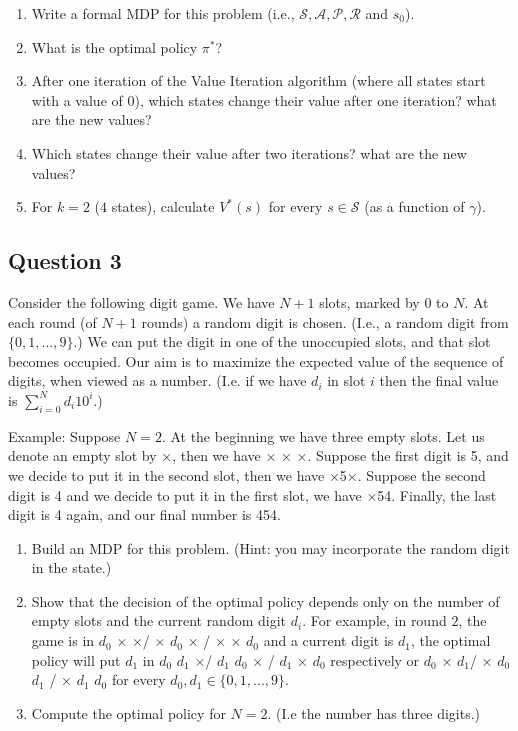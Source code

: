 \documentclass[11pt]{article}
\begin{document}
\begin{enumerate}
\item Write a formal MDP for this problem (i.e., $\mathcal{S}, {\mathcal{A}}, \mathcal{P}, {\mathcal{R}}$ and $s_0 $).
\item What is the optimal policy $\pi^*$?
\item After one iteration of the Value Iteration algorithm (where all states start with a value of $0$), which states change their value after one iteration? what are the new values?
\item Which states change their value after two iterations? what are the new values?
\item For $k=2$ ($4$ states), calculate $V^*(s)$ for every $s\in \mathcal{S}$ (as a function of $\gamma$).

\end{enumerate}

\newpage
\subsection{Question 3}
Consider the following digit game. We have $N+1$ slots, marked by $0$ to $N$. At each round (of $N+1$ rounds) a random digit is chosen. (I.e., a random digit from $\{0,1,...,9\}$.) We can put the digit in one of the unoccupied slots, and that slot becomes occupied. %
Our aim is to maximize the expected value of the sequence of digits, when viewed as a number. (I.e. if we have $d_i$ in slot $i$ then the final value is  $\sum_{i=0}^{N}d_i10^i$.)

Example: Suppose $N=2$. At the beginning we have three empty slots. Let us denote an empty slot by ×, then we have × × ×. Suppose the first digit is 5, and we decide to put it in the second slot, then we have ×5×. Suppose the second digit is 4 and we decide to put it in the first slot, we have ×54. Finally, the last digit is 4 again, and our final number is 454.

\begin{enumerate}
\item Build an MDP for this problem. (Hint: you may incorporate the random digit in the state.)
\item Show that the decision of the optimal policy depends only on the number of empty slots and the current random digit $d_i$. For example, in round $2$, the game is in $d_0$ × ×/ × $d_0$ × /  × × $d_0$ and a current digit is $d_1$, the optimal policy will put $d_1$ in  $d_0$ $d_1$ ×/ $d_1$ $d_0$ × /  $d_1$ × $d_0$ respectively or $d_0$ × $d_1$/ × $d_0$ $d_1$ /  × $d_1$ $d_0$ for every $d_0,d_1\in \{0,1,...,9\}$.
\item Compute the optimal policy for $N=2$. (I.e the number has three digits.)
\end{enumerate}
\end{document}
